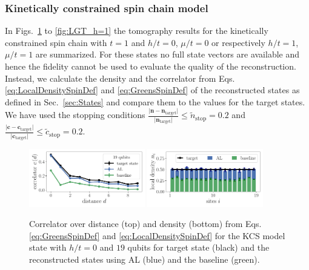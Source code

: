 \documentclass[pra,aps,showpacs,groupedaddress,superscriptaddress,twocolumn,toc=flat,biblatex,footinbib]{revtex4-1}
\renewcommand{\vec}[1]{\bm{#1}}
\begin{document}
\subsubsection{Kinetically constrained spin chain model}

In Figs.~\ref{fig:LGT_h=0_2} to \ref{fig:LGT_h=1} the tomography results for the kinetically constrained spin chain with $t=1$ and $h/t=0$, $\mu/t=0$ or respectively $h/t=1$, $\mu/t=1$ are summarized. For these states no full state vectors are available and hence the fidelity cannot be used to evaluate the quality of the reconstruction. Instead, we calculate the density and the correlator from Eqs. \eqref{eq:LocalDensitySpinDef} and \eqref{eq:GreensSpinDef} of the reconstructed states as defined in Sec.~\ref{sec:States} and compare them to the values for the target states. We have used the stopping conditions $\frac{\vert \vec{n}-\vec{n}_{\mathrm{target}}\vert}{\vert \vec{n}_{\mathrm{target}}\vert}\leq \tilde{n}_{\mathrm{stop}}=0.2$ and $\frac{\vert \vec{c}-\vec{c}_{\mathrm{target}}\vert}{\vert \vec{c}_{\mathrm{target}}\vert}\leq \tilde{c}_{\mathrm{stop}}=0.2$.


\begin{figure}[t]
	\centering
   \includegraphics[width=0.45\textwidth]{Fig7a.pdf}
   \includegraphics[width=0.45\textwidth]{Fig7b.pdf}
	\caption[]{Correlator over distance (top) and density (bottom) from Eqs. \eqref{eq:GreensSpinDef} and \eqref{eq:LocalDensitySpinDef} for the KCS model state with $h/t=0$ and $19$ qubits for target state (black) and the reconstructed states using AL (blue) and the baseline (green).}
	\label{fig:LGT_h=0_2}
\end{figure}
\end{document}
